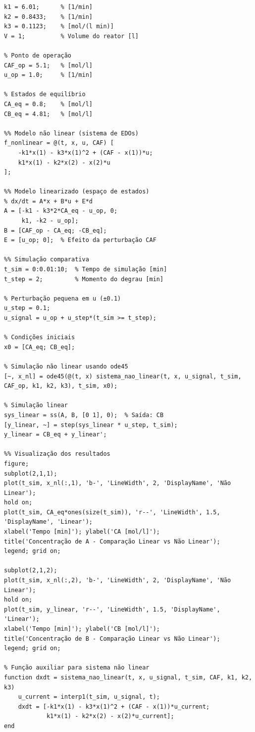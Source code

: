 \documentclass[a4paper,12pt]{article}
\begin{document}
\begin{lstlisting}[caption=Código MATLAB para simulação comparativa]
%% Parâmetros do processo
k1 = 6.01;      % [1/min]
k2 = 0.8433;    % [1/min] 
k3 = 0.1123;    % [mol/(l min)]
V = 1;          % Volume do reator [l]

% Ponto de operação
CAF_op = 5.1;   % [mol/l]
u_op = 1.0;     % [1/min]

% Estados de equilíbrio
CA_eq = 0.8;    % [mol/l]
CB_eq = 4.81;   % [mol/l]

%% Modelo não linear (sistema de EDOs)
f_nonlinear = @(t, x, u, CAF) [
    -k1*x(1) - k3*x(1)^2 + (CAF - x(1))*u;
    k1*x(1) - k2*x(2) - x(2)*u
];

%% Modelo linearizado (espaço de estados)
% dx/dt = A*x + B*u + E*d
A = [-k1 - k3*2*CA_eq - u_op, 0;
     k1, -k2 - u_op];
B = [CAF_op - CA_eq; -CB_eq];
E = [u_op; 0];  % Efeito da perturbação CAF

%% Simulação comparativa
t_sim = 0:0.01:10;  % Tempo de simulação [min]
t_step = 2;         % Momento do degrau [min]

% Perturbação pequena em u (±0.1)
u_step = 0.1;
u_signal = u_op + u_step*(t_sim >= t_step);

% Condições iniciais
x0 = [CA_eq; CB_eq];

% Simulação não linear usando ode45
[~, x_nl] = ode45(@(t, x) sistema_nao_linear(t, x, u_signal, t_sim, CAF_op, k1, k2, k3), t_sim, x0);

% Simulação linear
sys_linear = ss(A, B, [0 1], 0);  % Saída: CB
[y_linear, ~] = step(sys_linear * u_step, t_sim);
y_linear = CB_eq + y_linear';

%% Visualização dos resultados
figure;
subplot(2,1,1);
plot(t_sim, x_nl(:,1), 'b-', 'LineWidth', 2, 'DisplayName', 'Não Linear');
hold on;
plot(t_sim, CA_eq*ones(size(t_sim)), 'r--', 'LineWidth', 1.5, 'DisplayName', 'Linear');
xlabel('Tempo [min]'); ylabel('CA [mol/l]');
title('Concentração de A - Comparação Linear vs Não Linear');
legend; grid on;

subplot(2,1,2);
plot(t_sim, x_nl(:,2), 'b-', 'LineWidth', 2, 'DisplayName', 'Não Linear');
hold on;
plot(t_sim, y_linear, 'r--', 'LineWidth', 1.5, 'DisplayName', 'Linear');
xlabel('Tempo [min]'); ylabel('CB [mol/l]');
title('Concentração de B - Comparação Linear vs Não Linear');
legend; grid on;

% Função auxiliar para sistema não linear
function dxdt = sistema_nao_linear(t, x, u_signal, t_sim, CAF, k1, k2, k3)
    u_current = interp1(t_sim, u_signal, t);
    dxdt = [-k1*x(1) - k3*x(1)^2 + (CAF - x(1))*u_current;
            k1*x(1) - k2*x(2) - x(2)*u_current];
end
\end{lstlisting}
\end{document}
